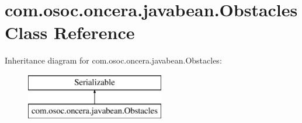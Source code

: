 \hypertarget{classcom_1_1osoc_1_1oncera_1_1javabean_1_1_obstacles}{}\section{com.\+osoc.\+oncera.\+javabean.\+Obstacles Class Reference}
\label{classcom_1_1osoc_1_1oncera_1_1javabean_1_1_obstacles}
Inheritance diagram for com.\+osoc.\+oncera.\+javabean.\+Obstacles\+:\begin{figure}[H]
\begin{center}
\leavevmode
\includegraphics[height=2.000000cm]{classcom_1_1osoc_1_1oncera_1_1javabean_1_1_obstacles}
\end{center}
\end{figure}
